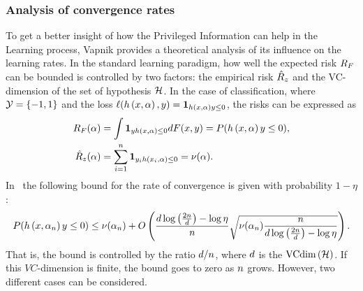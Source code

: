 \subsubsection*{Analysis of convergence rates}
To get a better insight of how the Privileged Information can help in the Learning process, Vapnik provides a theoretical analysis of its influence on the learning rates.
In the standard learning paradigm, how well the expected risk $R_F$ can be bounded is controlled by two factors: the empirical risk $\hat{R}_z$ and the VC-dimension of the set of hypothesis $\mathcal{\mathcal{H}}$.
In the case of classification, where $\mathcal{Y} = \left\{-1, 1\right\}$ and the loss $\ell(h\left(x, \alpha\right), y) = \bm{1}_{h\left(x, \alpha\right) y \leq 0}$, the risks can be expressed as
\begin{align*}
    \nonumber
    R_F (\alpha) &= \int \bm{1}_{y h\left(x, \alpha\right) \leq 0} dF(x, y) =  P(h\left(x, \alpha\right) y \leq 0) ,\\
    \hat{R}_z(\alpha) &= \sum_{i=1}^n \bm{1}_{y_i h\left(x_i, \alpha\right) \leq 0} = \nu(\alpha) .
\end{align*}
In~\cite[Theorem~6.8]{vapnik1982estimation} the following bound for the rate of convergence is given with probability $1 - \eta$:
\begin{equation}
    \nonumber
    P(h\left(x, \alpha_n\right) y \leq 0) \leq \nu(\alpha_n) + O\left( \frac{d \log\left(\frac{2n}{d} \right) - \log\eta}{n} \sqrt{\nu(\alpha_n) \frac{n}{d \log\left(\frac{2n}{d} \right) - \log\eta}}  \right) .
\end{equation}
That is, the bound is controlled by the ratio $d/n$, where $d$ is the $\text{VCdim}\left(\mathcal{H}\right)$. If this $VC$-dimension is finite, the bound goes to zero as $n$ grows.
However, two different cases can be considered.
\\

